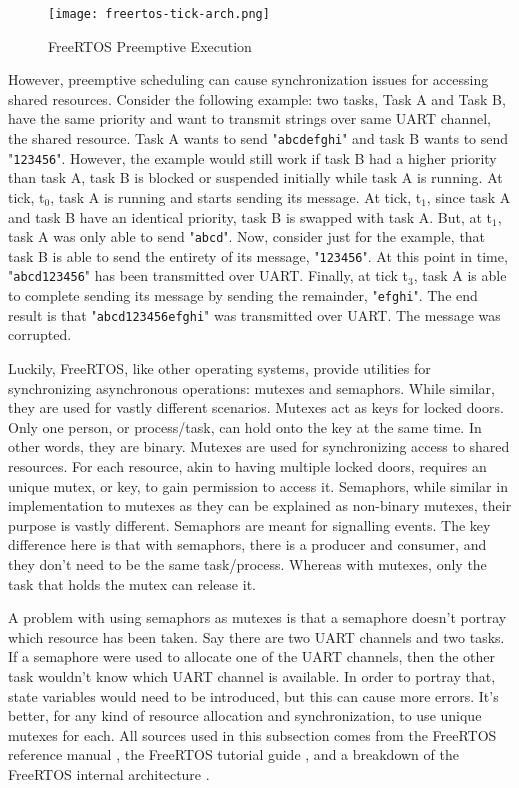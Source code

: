 \begin{figure}
\centering
\texttt{[image: freertos-tick-arch.png]}
\caption{FreeRTOS Preemptive Execution}
\label{fig:freertos-tick-arch}
\end{figure}

However, preemptive scheduling can cause synchronization issues for accessing
shared resources.  Consider the following example: two tasks, Task A and Task B,
have the same priority and want to transmit strings over same UART channel, the
shared resource. Task A wants to send "\texttt{abcdefghi}" and task B wants to send
"\texttt{123456}".  However, the example would still work if task B had a higher priority
than task A, task B is blocked or suspended initially while task A is running.
At tick, t$_0$, task A is running and starts sending its message. At tick,
t$_1$, since task A and task B have an identical priority, task B is swapped
with task A.  But, at t$_1$, task A was only able to send "\texttt{abcd}". Now, consider
just for the example, that task B is able to send the entirety of its message,
"\texttt{123456}". At this point in time, "\texttt{abcd123456}" has been transmitted over UART.
Finally, at tick t$_3$, task A is able to complete sending its message by
sending the remainder, "\texttt{efghi}". The end result is that "\texttt{abcd123456efghi}" was
transmitted over UART. The message was corrupted. 

Luckily, FreeRTOS, like other operating systems, provide utilities for
synchronizing asynchronous operations: mutexes and semaphors. While similar,
they are used for vastly different scenarios.  Mutexes act as keys for locked
doors. Only one person, or process/task, can hold onto the key at the same time.
In other words, they are binary. Mutexes are used for synchronizing access to shared
resources. For each resource, akin to having multiple locked doors, requires an
unique mutex, or key, to gain permission to access it. Semaphors, while similar
in implementation to mutexes as they can be explained as non-binary mutexes,
their purpose is vastly different. Semaphors are meant for signalling events.
The key difference here is that with semaphors, there is a producer and
consumer, and they don't need to be the same task/process. Whereas with mutexes,
only the task that holds the mutex can release it.

A problem with using
semaphors as mutexes is that a semaphore doesn't portray which resource has been
taken. Say there are two UART channels and two tasks. If a semaphore were used
to allocate one of the UART channels, then the other task wouldn't know which
UART channel is available. In order to portray that, state variables would need
to be introduced, but this can cause more errors. It's better, for any kind of
resource allocation and synchronization, to use unique mutexes for each. All
sources used in this subsection comes from the FreeRTOS reference manual
\cite{freertos-ref}, the FreeRTOS tutorial guide \cite{freertos-guide}, and
a breakdown of the FreeRTOS internal architecture \cite{about-freertos-arch}.

